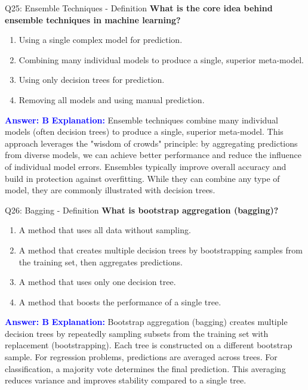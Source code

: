 \documentclass[8pt]{beamer}
\begin{document}
	\begin{frame}{Q25: Ensemble Techniques - Definition}
		\fontsize{6.5}{7.5}\selectfont
		\textbf{What is the core idea behind ensemble techniques in machine learning?}
		\begin{enumerate}
			\item Using a single complex model for prediction.
			\item Combining many individual models to produce a single, superior meta-model.
			\item Using only decision trees for prediction.
			\item Removing all models and using manual prediction.
		\end{enumerate}
		\vspace{0.1cm}
		\textcolor{blue}{\textbf{Answer: B}}
		\vspace{0.1cm}
		\textcolor{blue}{\textbf{Explanation:}} Ensemble techniques combine many individual models (often decision trees) to produce a single, superior meta-model. This approach leverages the "wisdom of crowds" principle: by aggregating predictions from diverse models, we can achieve better performance and reduce the influence of individual model errors. Ensembles typically improve overall accuracy and build in protection against overfitting. While they can combine any type of model, they are commonly illustrated with decision trees.
	\end{frame}
	
	
	\begin{frame}{Q26: Bagging - Definition}
		\fontsize{6.5}{7.5}\selectfont
		\textbf{What is bootstrap aggregation (bagging)?}
		\begin{enumerate}
			\item A method that uses all data without sampling.
			\item A method that creates multiple decision trees by bootstrapping samples from the training set, then aggregates predictions.
			\item A method that uses only one decision tree.
			\item A method that boosts the performance of a single tree.
		\end{enumerate}
		\vspace{0.1cm}
		\textcolor{blue}{\textbf{Answer: B}}
		\vspace{0.1cm}
		\textcolor{blue}{\textbf{Explanation:}} Bootstrap aggregation (bagging) creates multiple decision trees by repeatedly sampling subsets from the training set with replacement (bootstrapping). Each tree is constructed on a different bootstrap sample. For regression problems, predictions are averaged across trees. For classification, a majority vote determines the final prediction. This averaging reduces variance and improves stability compared to a single tree.
	\end{frame}
	
\end{document}
